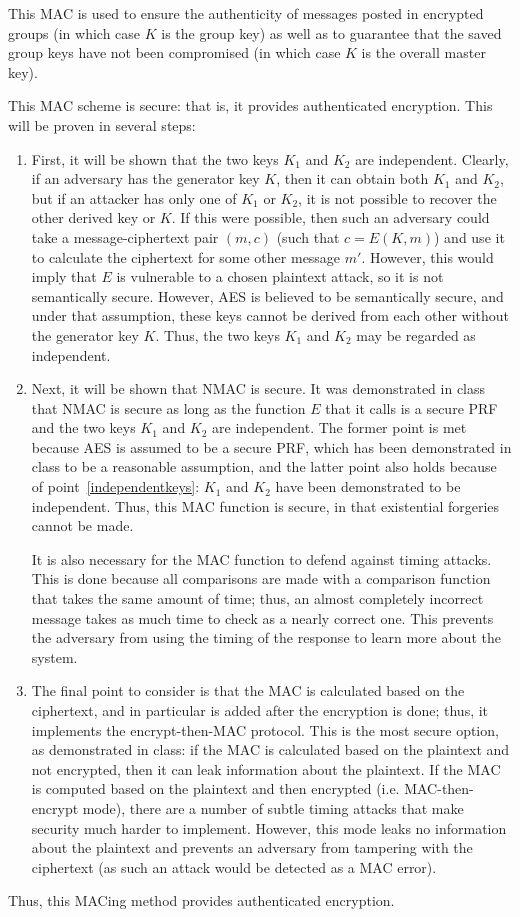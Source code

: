 \documentclass{amsart}
\begin{document}
This MAC is used to ensure the authenticity of messages posted in encrypted groups (in which case $K$ is the group key) as well as to guarantee that the saved group keys have not been compromised (in which case $K$ is the overall master key).

This MAC scheme is secure: that is, it provides authenticated encryption. This will be proven in several steps:
\begin{enumerate}
\item\label{independentkeys} First, it will be shown that the two keys $K_1$ and $K_2$ are independent. Clearly, if an adversary has the generator key $K$, then it can obtain both $K_1$ and $K_2$, but if an attacker has only one of $K_1$ or $K_2$, it is not possible to recover the other derived key or $K$. If this were possible, then such an adversary could take a message-ciphertext pair $(m,c)$ (such that $c = E(K,m)$) and use it to calculate the ciphertext for some other message $m'$. However, this would imply that $E$ is vulnerable to a chosen plaintext attack, so it is not semantically secure. However, AES is believed to be semantically secure, and under that assumption, these keys cannot be derived from each other without the generator key $K$. Thus, the two keys $K_1$ and $K_2$ may be regarded as independent.
\item Next, it will be shown that NMAC is secure. It was demonstrated in class that NMAC is secure as long as the function $E$ that it calls is a secure PRF and the two keys $K_1$ and $K_2$ are independent. The former point is met because AES is assumed to be a secure PRF, which has been demonstrated in class to be a reasonable assumption, and the latter point also holds because of point~\ref{independentkeys}: $K_1$ and $K_2$ have been demonstrated to be independent. Thus, this MAC function is secure, in that existential forgeries cannot be made.

It is also necessary for the MAC function to defend against timing attacks. This is done because all comparisons are made with a comparison function that takes the same amount of time; thus, an almost completely incorrect message takes as much time to check as a nearly correct one. This prevents the adversary from using the timing of the response to learn more about the system.
\item The final point to consider is that the MAC is calculated based on the ciphertext, and in particular is added after the encryption is done; thus, it implements the encrypt-then-MAC protocol. This is the most secure option, as demonstrated in class: if the MAC is calculated based on the plaintext and not encrypted, then it can leak information about the plaintext. If the MAC is computed based on the plaintext and then encrypted (i.e. MAC-then-encrypt mode), there are a number of subtle timing attacks that make security much harder to implement. However, this mode leaks no information about the plaintext and prevents an adversary from tampering with the ciphertext (as such an attack would be detected as a MAC error).
\end{enumerate}
Thus, this MACing method provides authenticated encryption.
\end{document}
